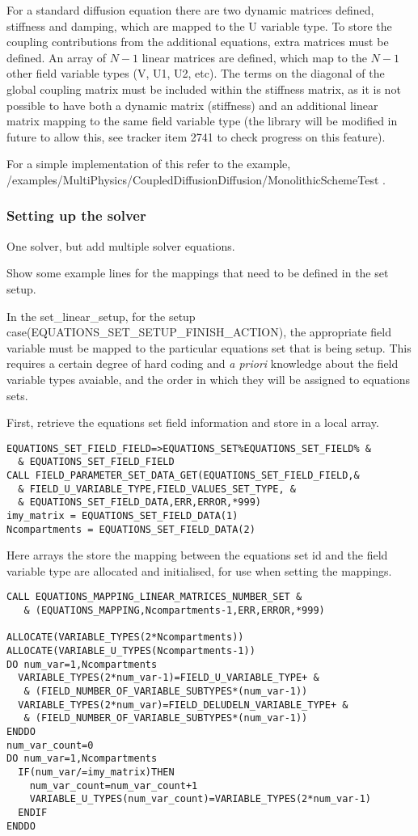 For a standard diffusion equation there are two dynamic matrices defined, stiffness and damping, which are mapped to the U variable type. To store the coupling contributions from the additional equations, extra matrices must be defined. An array of $N-1$ linear matrices are defined, which map to the $N-1$ other field variable types (V, U1, U2, etc). The terms on the diagonal of the global coupling matrix must be included within the stiffness matrix, as it is not possible to have both a dynamic matrix (stiffness) and an additional linear matrix mapping to the same field variable type (the library will be modified in future to allow this, see tracker item 2741 to check progress on this feature). 

For a simple implementation of this refer to the example, /examples/MultiPhysics/CoupledDiffusionDiffusion/MonolithicSchemeTest .

\subsubsection{Setting up the solver}

One solver, but add multiple solver equations.

Show some example lines for the mappings that need to be defined in the set setup.

In the set\_linear\_setup, for the setup case(EQUATIONS\_SET\_SETUP\_FINISH\_ACTION), the appropriate field variable must be mapped to the particular equations set that is being setup. This requires a certain degree of hard coding and \textit{a priori} knowledge about the field variable types avaiable, and the order in which they will be assigned to equations sets.

First, retrieve the equations set field information and store in a local array.
\begin{lstlisting}
EQUATIONS_SET_FIELD_FIELD=>EQUATIONS_SET%EQUATIONS_SET_FIELD% &
  & EQUATIONS_SET_FIELD_FIELD
CALL FIELD_PARAMETER_SET_DATA_GET(EQUATIONS_SET_FIELD_FIELD,& 
  & FIELD_U_VARIABLE_TYPE,FIELD_VALUES_SET_TYPE, &
  & EQUATIONS_SET_FIELD_DATA,ERR,ERROR,*999)
imy_matrix = EQUATIONS_SET_FIELD_DATA(1)
Ncompartments = EQUATIONS_SET_FIELD_DATA(2)
\end{lstlisting}

Here arrays the store the mapping between the equations set id and the field variable type are allocated and initialised, for use when setting the mappings.

\begin{lstlisting}
CALL EQUATIONS_MAPPING_LINEAR_MATRICES_NUMBER_SET &
   & (EQUATIONS_MAPPING,Ncompartments-1,ERR,ERROR,*999)

ALLOCATE(VARIABLE_TYPES(2*Ncompartments))
ALLOCATE(VARIABLE_U_TYPES(Ncompartments-1))
DO num_var=1,Ncompartments
  VARIABLE_TYPES(2*num_var-1)=FIELD_U_VARIABLE_TYPE+ &
   & (FIELD_NUMBER_OF_VARIABLE_SUBTYPES*(num_var-1))
  VARIABLE_TYPES(2*num_var)=FIELD_DELUDELN_VARIABLE_TYPE+ &
   & (FIELD_NUMBER_OF_VARIABLE_SUBTYPES*(num_var-1))
ENDDO
num_var_count=0
DO num_var=1,Ncompartments
  IF(num_var/=imy_matrix)THEN
    num_var_count=num_var_count+1
    VARIABLE_U_TYPES(num_var_count)=VARIABLE_TYPES(2*num_var-1)
  ENDIF
ENDDO
\end{lstlisting}


